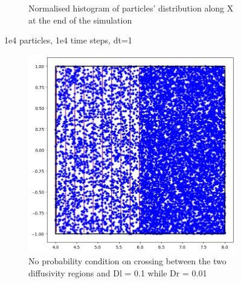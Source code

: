 \documentclass{article}
\begin{document}
\begin{figure}[htbp]
\begin{subfigure}[b]{0.45\textwidth}
        \caption{Normalised histogram of particles' distribution along X at the end of the simulation}
    \end{subfigure}
    \caption{1e4 particles, 1e4 time steps, dt=1}
    \label{fig:MatrixDiffusion1}
\end{figure}

\begin{figure}[htbp]
    \centering
    \begin{subfigure}[b]{0.45\textwidth}
        \centering
        \includegraphics[width=\textwidth]{images/positionsDl01Dr001Rl0Rr0.png}
        \caption{No probability condition on crossing between the two diffusivity regions and Dl = 0.1 while Dr = 0.01}
    \end{subfigure}
    \hfill
    \begin{subfigure}[b]{0.45\textwidth}
        \centering

\end{subfigure}
\end{figure}
\end{document}
